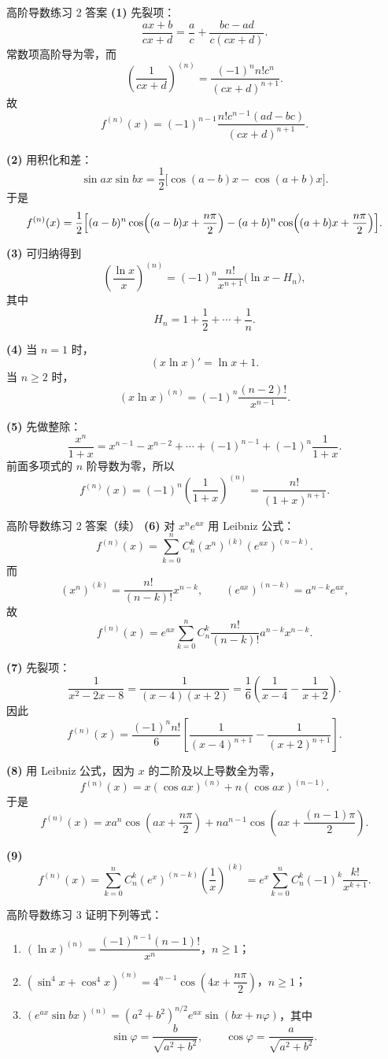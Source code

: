 ﻿\documentclass[aspectratio=169,11pt]{ctexbeamer}
\begin{document}
\begin{frame}[allowframebreaks]{高阶导数练习 2 答案}
\small
\textbf{(1)} 先裂项：
\[
\frac{ax+b}{cx+d}=\frac ac+\frac{bc-ad}{c(cx+d)}.
\]
常数项高阶导为零，而
\[
\left(\frac1{cx+d}\right)^{(n)}=\frac{(-1)^nn!c^n}{(cx+d)^{n+1}}.
\]
故
\[
f^{(n)}(x)=(-1)^{n-1}\frac{n!c^{n-1}(ad-bc)}{(cx+d)^{n+1}}.
\]

\textbf{(2)} 用积化和差：
\[
\sin ax\sin bx=\frac12\bigl[\cos(a-b)x-\cos(a+b)x\bigr].
\]
于是
\[
f^{(n)}(x)=\frac12\Bigl[(a-b)^n\cos\!\left((a-b)x+\frac{n\pi}{2}\right)
-(a+b)^n\cos\!\left((a+b)x+\frac{n\pi}{2}\right)\Bigr].
\]

\textbf{(3)} 可归纳得到
\[
\left(\frac{\ln x}{x}\right)^{(n)}
=(-1)^n\frac{n!}{x^{n+1}}\bigl(\ln x-H_n\bigr),
\]
其中
\[
H_n=1+\frac12+\cdots+\frac1n.
\]

\textbf{(4)} 当 $n=1$ 时，
\[
(x\ln x)'=\ln x+1.
\]
当 $n\ge2$ 时，
\[
(x\ln x)^{(n)}=(-1)^n\frac{(n-2)!}{x^{n-1}}.
\]

\textbf{(5)} 先做整除：
\[
\frac{x^n}{1+x}=x^{n-1}-x^{n-2}+\cdots+(-1)^{n-1}+(-1)^n\frac1{1+x}.
\]
前面多项式的 $n$ 阶导数为零，所以
\[
f^{(n)}(x)=(-1)^n\left(\frac1{1+x}\right)^{(n)}=\frac{n!}{(1+x)^{n+1}}.
\]
\end{frame}

\begin{frame}[allowframebreaks]{高阶导数练习 2 答案（续）}
\small
\textbf{(6)} 对 $x^ne^{ax}$ 用 Leibniz 公式：
\[
f^{(n)}(x)=\sum_{k=0}^n C_n^k (x^n)^{(k)}(e^{ax})^{(n-k)}.
\]
而
\[
(x^n)^{(k)}=\frac{n!}{(n-k)!}x^{n-k},\qquad (e^{ax})^{(n-k)}=a^{n-k}e^{ax},
\]
故
\[
f^{(n)}(x)=e^{ax}\sum_{k=0}^n C_n^k \frac{n!}{(n-k)!}a^{n-k}x^{n-k}.
\]

\textbf{(7)} 先裂项：
\[
\frac1{x^2-2x-8}=\frac1{(x-4)(x+2)}=\frac16\left(\frac1{x-4}-\frac1{x+2}\right).
\]
因此
\[
f^{(n)}(x)=\frac{(-1)^nn!}{6}\left[\frac1{(x-4)^{n+1}}-\frac1{(x+2)^{n+1}}\right].
\]

\textbf{(8)} 用 Leibniz 公式，因为 $x$ 的二阶及以上导数全为零，
\[
f^{(n)}(x)=x(\cos ax)^{(n)}+n(\cos ax)^{(n-1)}.
\]
于是
\[
f^{(n)}(x)=xa^n\cos\!\left(ax+\frac{n\pi}{2}\right)
+na^{n-1}\cos\!\left(ax+\frac{(n-1)\pi}{2}\right).
\]

\textbf{(9)}
\[
f^{(n)}(x)=\sum_{k=0}^n C_n^k (e^x)^{(n-k)}\left(\frac1x\right)^{(k)}
=e^x\sum_{k=0}^n C_n^k (-1)^k\frac{k!}{x^{k+1}}.
\]
\end{frame}

\begin{frame}{高阶导数练习 3}
\small
证明下列等式：
\begin{enumerate}
\item $(\ln x)^{(n)}=\dfrac{(-1)^{n-1}(n-1)!}{x^n}$，$n\ge1$；
\item $(\sin^4x+\cos^4x)^{(n)}=4^{n-1}\cos\!\left(4x+\dfrac{n\pi}{2}\right)$，$n\ge1$；
\item $(e^{ax}\sin bx)^{(n)}=(a^2+b^2)^{n/2}e^{ax}\sin(bx+n\varphi)$，其中
\[
\sin\varphi=\frac{b}{\sqrt{a^2+b^2}},\qquad
\cos\varphi=\frac{a}{\sqrt{a^2+b^2}}.
\]
\end{enumerate}
\end{frame}
\end{document}
